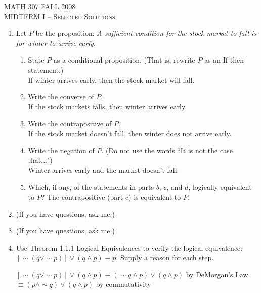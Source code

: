 \documentclass[12pt]{article}
\begin{document}
\begin{center}MATH 307  \: FALL 2008 \\ \textsc{MIDTERM I -- Selected Solutions}
\end{center}

\begin{enumerate}
\item Let $P$ be the proposition:
 \emph{A sufficient condition for the stock market to fall is for winter to arrive early}.  \\
\begin{enumerate}
\item State $P$ as a conditional proposition. (That is, rewrite $P$ as an If-then statement.)\\
If winter arrives early, then the stock market will fall.
\item Write the converse of $P$.\\
If the stock markets falls, then winter arrives early.
\item Write the  contrapositive of $P$.\\
If the stock market doesn't fall, then winter does not arrive early. 
\item Write the negation of $P.$ (Do not use the words ``It is not the case that...")\\
Winter arrives early and the market doesn't fall.
\item Which, if any, of the statements in parts $b$, $c$, and $d$, logically equivalent to $P$?
The contrapositive (part c) is equivalent to $P.$
\end{enumerate}

\item (If you have questions, ask me.)

\item (If you have questions, ask me.)

\item  Use Theorem 1.1.1 Logical Equivalences to verify the logical equivalence: \\
$[\sim(q \vee \sim p)] \vee (q \wedge p) \equiv p. $ Supply a reason for each step.\\

\smallskip

$[\sim(q \vee \sim p)] \vee (q \wedge p) \equiv (\sim q \wedge p) \vee (q \wedge p)$ by DeMorgan's Law\\

\hspace{1.6in} $\equiv (p \wedge \sim q) \vee (q \wedge p)$ by commutativity\\


\end{enumerate}
\end{document}
